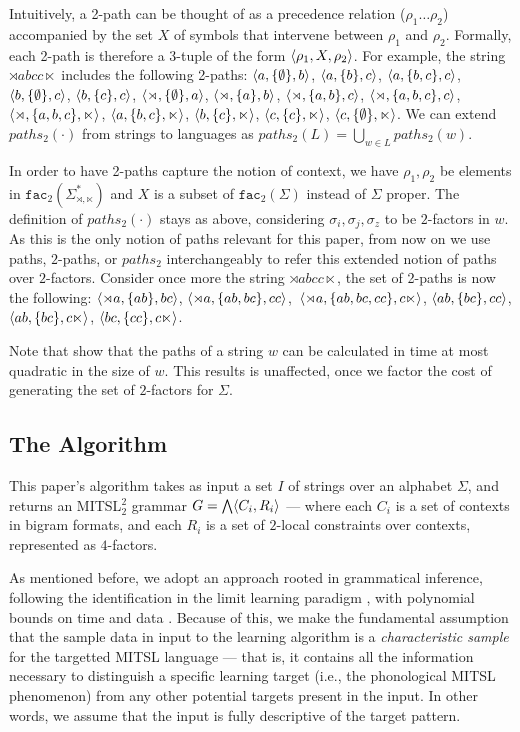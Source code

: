 \documentclass[11pt,a4paper]{article}
\newcommand{\facn}[1]{\ensuremath{\texttt{fac}_{#1}}}
\begin{document}
Intuitively, a 2-path can be thought of as a precedence relation ($\rho_1\ldots{}\rho_2$) accompanied by the set $X$ of symbols that intervene between $\rho_1$ and $\rho_2$. Formally, each 2-path is therefore a 3-tuple of the form $\langle{\rho_1, X, \rho_2}\rangle$. For example, the string $\rtimes abcc\ltimes$ includes the following 2-paths: 
$\langle{a, \{\emptyset\}, b}\rangle$, $\langle{a, \{b\}, c}\rangle$, $\langle{a, \{b,c\}, c}\rangle$, $\langle{b, \{\emptyset\}, c}\rangle$, $\langle{b, \{c\}, c}\rangle$, $\langle{\rtimes, \{\emptyset\}, a}\rangle$, $\langle{\rtimes, \{a\}, b}\rangle$,  $\langle{\rtimes, \{a,b\}, c}\rangle$, $ \langle{\rtimes,\{a,b,c\},c}\rangle$, $ \langle{\rtimes,\{a,b,c\},\ltimes}\rangle$, $\langle{a, \{b,c\}, \ltimes}\rangle$, $ \langle{b, \{c\}, \ltimes}\rangle$, $\langle{c, \{c\}, \ltimes}\rangle$, $ \langle{c, \{\emptyset\}, \ltimes}\rangle$.\@
We can extend  $paths_2(\cdot)$ from strings to languages as $paths_2(L) = \bigcup_{w \in L} paths_2(w)$.

In order to have 2-paths capture the notion of context, we  have   $\rho_1, \rho_2$ be elements in $ \facn{2}(\Sigma^*_{\rtimes,\ltimes})$ and $X$ is a subset of $ \facn{2}(\Sigma)$ instead of $\Sigma$ proper.\@
The definition of $paths_2(\cdot)$ stays as above, considering $\sigma_i,\sigma_j,\sigma_z$ to be $2$-factors in $w$.\@
As this is the only notion of paths relevant for this paper, from now on we use paths, $2$-paths, or $paths_2$ interchangeably to refer this extended notion of paths over $2$-factors.
Consider once more the string $\rtimes abcc\ltimes$,  the set of  2-paths is now the following: 
$\langle{\rtimes a, \{ab\}, bc}\rangle$, $\langle{\rtimes a, \{ab,bc\}, cc}\rangle$,~$\langle{\rtimes a, \{ab,bc,cc\}, c\ltimes}\rangle$, $\langle{ab, \{bc\}, cc}\rangle$, $\langle{ab, \{bc\}, c\ltimes}\rangle$, $\langle{bc,  \{cc\}, c\ltimes}\rangle$. 

Note that  \citet{JardineHeinz16} show that the paths of a string $w$ can be calculated in time at most quadratic in the size of $w$.
This results is unaffected, once we factor the cost of generating the set of $2$-factors for $\Sigma$.


\subsection{The Algorithm}

This paper's algorithm  takes as input a set $I$ of strings over an alphabet $\Sigma$, and returns an MITSL$^2_2$ grammar $G=\bigwedge\langle{C_i,R_i}\rangle$ --- where each $C_i$ is a set of contexts in bigram formats, and each $R_i$ is a set of $2$-local constraints over contexts, represented as $4$-factors.

As mentioned before, we adopt an approach rooted in grammatical inference, following the identification in the limit learning paradigm \cite{gold1967language}, with polynomial bounds on time and data \cite{de2010grammatical}.\@
Because of this, we make the fundamental assumption that the sample data in input to the learning algorithm is a \emph{characteristic sample} for the targetted MITSL  language --- that is, it contains all the information necessary to distinguish a specific learning target (i.e., the phonological MITSL phenomenon) from any other potential targets present in the input.
In other words, we assume that the input is fully descriptive of the target pattern.
\end{document}
